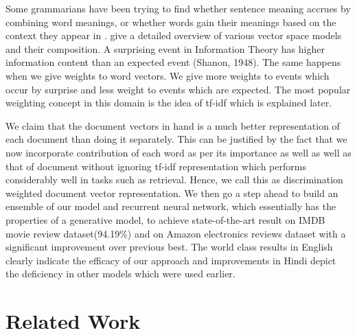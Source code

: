 \documentclass[11pt,a4paper]{article}
\begin{document}
Some grammarians have been trying to find whether sentence meaning accrues by combining word meanings, or whether words gain their meanings based on the context they appear in \cite{Matilal:90}. 
\cite{Turney:10} give a detailed overview of various vector space models and their composition. A surprising event in Information Theory has higher information content than an expected event (Shanon, 1948). The same happens when we give weights to word vectors. We give more weights to events which occur by surprise and less weight to events which are expected. The most popular weighting concept in this domain is the idea of tf-idf which is explained later.

We claim that the document vectors in hand is a much better representation of each document than doing it separately. This can be justified by the fact that we now incorporate contribution of each
word as per its importance as well as well as that of document without ignoring tf-idf representation which performs considerably well in tasks such as retrieval. Hence, we call this as discrimination weighted document vector representation. We then go a step ahead to build an ensemble of our model and recurrent neural network, which essentially has the properties of a generative model, to achieve state-of-the-art result on IMDB movie review dataset(94.19\%) and on Amazon electronics reviews dataset with a significant improvement over previous best.
The world class results in English clearly indicate the efficacy of our approach and improvements in Hindi depict the deficiency in other models which were used earlier.

\section{Related Work}
\end{document}
